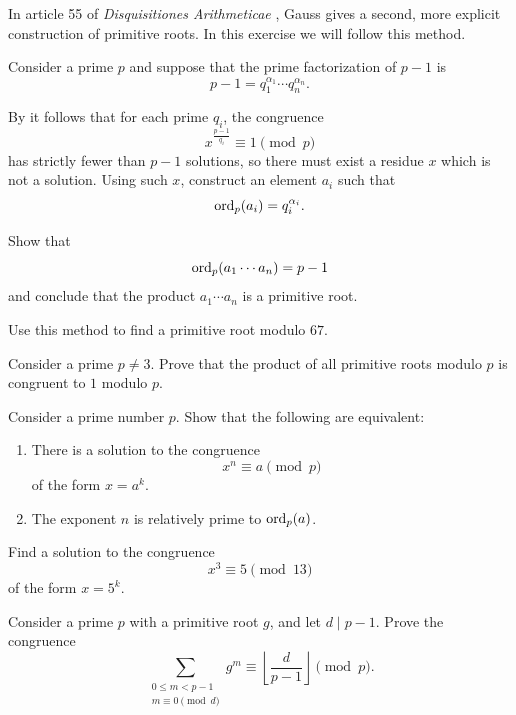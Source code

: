 \begin{routine}
  \exercise In article 55 of \emph{Disquisitiones Arithmeticae} \cite{gauss1986}, Gauss gives a second, more explicit construction of primitive roots. In this exercise we will follow this method.

  Consider a prime $p$ and suppose that the prime factorization of $p-1$ is
  \begin{equation*}
    p-1=q_1^{\alpha_1}\cdots q_n^{\alpha_n}.
  \end{equation*}
  \begin{subexenum}
  \item By  it follows that for each prime $q_i$, the congruence
    \begin{equation*}
      x^{\frac{p-1}{q_i}}\equiv 1\pmod{p}
    \end{equation*}
    has strictly fewer than $p-1$ solutions, so there must exist a residue $x$ which is not a solution. Using such $x$, construct an element $a_i$ such that
    \begin{equation*}
      \operatorname{ord}_p(a_i)=q_i^{\alpha_i}.
    \end{equation*}
  \item Show that
    \begin{equation*}
      \operatorname{ord}_p(a_1\cdots a_n)=p-1
    \end{equation*}
    and conclude that the product $a_1\cdots a_n$ is a primitive root.
    \item Use this method to find a primitive root modulo $67$.
  \end{subexenum}
  \exercise Consider a prime $p\neq 3$. Prove that the product of all primitive roots modulo $p$ is congruent to $1$ modulo $p$.
  \exercise
  \begin{subexenum}
  \item Consider a prime number $p$. Show that the following are equivalent:
    \begin{enumerate}
    \item There is a solution to the congruence
      \begin{equation*}
        x^n\equiv a\pmod{p}
      \end{equation*}
      of the form $x=a^k$.
    \item The exponent $n$ is relatively prime to $\operatorname{ord}_p(a)$.
    \end{enumerate}
  \item Find a solution to the congruence
    \begin{equation*}
      x^3\equiv 5\pmod{13}
    \end{equation*}
    of the form $x=5^k$.
  \end{subexenum}
  \exercise Consider a prime $p$ with a primitive root $g$, and let $d\mid p-1$. Prove the congruence
  \begin{equation*}
    \sum_{\substack{0\leq m < p-1 \\ m\equiv 0\pmod{d}}}g^m\equiv \left\lfloor\frac{d}{p-1}\right\rfloor\pmod{p}.
  \end{equation*}
\end{routine}

